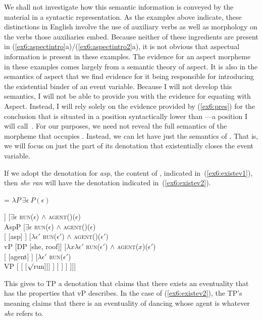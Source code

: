 We shall not investigate how this semantic information is conveyed by the material in a syntactic representation. As the examples above indicate, these distinctions in English involve the use of auxiliary verbs as well as morphology on the verbs those auxiliaries embed. Because neither of these ingredients are present in (\ref{ex6:aspectintro}a)/(\ref{ex6:aspectintro2}a), it is not obvious that aspectual information is present in these examples. The evidence for an aspect morpheme in these examples comes largely from a semantic theory of aspect. It is also in the semantics of aspect that we find evidence for it being responsible for introducing the existential binder of an event variable. Because I will not develop this semantics, I will not be able to provide you with the evidence for equating  with Aspect. Instead, I will rely solely on the evidence provided by (\ref{ex6:pres}) for the conclusion that  is situated in a position syntactically lower than ---a position I will call~. For our purposes, we need not reveal the full semantics of the morpheme that occupies . Instead, we can let  have just the semantics of . That is, we will focus on just the part of its denotation that existentially closes the event variable.

If we adopt the denotation for \emph{asp}, the content of , indicated in~(\ref{ex6:existev1}), then \emph{she ran} will have the denotation indicated in~(\ref{ex6:existev2}).
\pagebreak
\begin{exe}
\raggedright
	\ex \label{ex6:existev1}
	 = $\lambda P\ \exists \epsilon\ P(\epsilon)$ 
	\ex \label{ex6:existev2} %
	\small
	\begin{forest}
	[$\exists \epsilon$ \textsc{run}($\epsilon$) $\wedge$ \textsc{agent}(\denotes{she})($\epsilon$)\\TP
	[\ibar{T}
	[\obar{T} [past]]
	[$\exists \epsilon$ \textsc{run}($\epsilon$) $\wedge$ \textsc{agent}()($\epsilon$)\\AspP
		[$\exists \epsilon$ \textsc{run}($\epsilon$) $\wedge$ \textsc{agent}()($\epsilon$)\\ 
			[ [asp] ]
			[$\lambda \epsilon'$ \textsc{run}($\epsilon'$) $\wedge$ \textsc{agent}()($\epsilon'$) \\vP
				[DP [she, roof]]
				[$\lambda x \lambda \epsilon'$ \textsc{run}($\epsilon'$) $\wedge$ \textsc{agent}($x$)($\epsilon'$) \\  
					[ [agent] ]
					[$\lambda \epsilon'$ \textsc{run}($\epsilon'$) \\VP [ [ [$\surd$run]]] ]
				]
			 ]
		]
	]]]
	\end{forest}
\end{exe}
This gives to TP a denotation that claims that there exists an eventuality that has the properties that vP describes. In the case of (\ref{ex6:existev2}), the TP's meaning claims that there is an eventuality of dancing whose agent is whatever \emph{she} refers to. 

